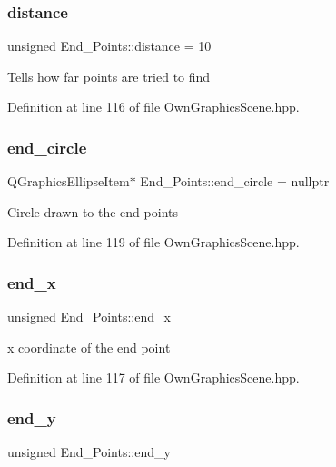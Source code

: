 \subsubsection{\texorpdfstring{distance}{distance}}
{\footnotesize\ttfamily unsigned End\+\_\+\+Points\+::distance = 10}

Tells how far points are tried to find 

Definition at line 116 of file Own\+Graphics\+Scene.\+hpp.

\mbox{\label{structEnd__Points_abf301947140c1584823b50071c7b8ee6}} 
\subsubsection{\texorpdfstring{end\+\_\+circle}{end\_circle}}
{\footnotesize\ttfamily Q\+Graphics\+Ellipse\+Item$\ast$ End\+\_\+\+Points\+::end\+\_\+circle = nullptr}

Circle drawn to the end points 

Definition at line 119 of file Own\+Graphics\+Scene.\+hpp.

\mbox{\label{structEnd__Points_a2b33a99792ec437e7c2369ceaf435176}} 
\subsubsection{\texorpdfstring{end\+\_\+x}{end\_x}}
{\footnotesize\ttfamily unsigned End\+\_\+\+Points\+::end\+\_\+x}

x coordinate of the end point 

Definition at line 117 of file Own\+Graphics\+Scene.\+hpp.

\mbox{\label{structEnd__Points_a04207ee9a97ee6d785b493305cd9e7e8}} 
\subsubsection{\texorpdfstring{end\+\_\+y}{end\_y}}
{\footnotesize\ttfamily unsigned End\+\_\+\+Points\+::end\+\_\+y}


